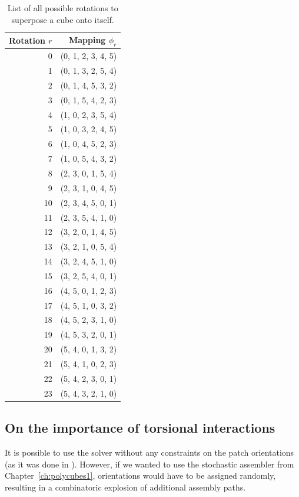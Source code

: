 \begin{table}[h]
    \centering
    \caption{List of all possible rotations to superpose a cube onto itself.}
    \begin{tabular}{|r|r|}
    \hline
    Rotation \(r\) & Mapping \(\phi_r\) \\
    \hline
    \hline
    0 & (0,  1,  2,  3,  4,  5) \\
    1 & (0,  1,  3,  2,  5,  4) \\
    2 & (0,  1,  4,  5,  3,  2) \\
    3 & (0,  1,  5,  4,  2,  3) \\
    4 & (1,  0,  2,  3,  5,  4) \\
    5 & (1,  0,  3,  2,  4,  5) \\
    6 & (1,  0,  4,  5,  2,  3) \\
    7 & (1,  0,  5,  4,  3,  2) \\
    8 & (2,  3,  0,  1,  5,  4) \\
    9 & (2,  3,  1,  0,  4,  5) \\
    10 & (2,  3,  4,  5,  0,  1) \\
    11 & (2,  3,  5,  4,  1,  0) \\
    12 & (3,  2,  0,  1,  4,  5) \\
    13 & (3,  2,  1,  0,  5,  4) \\
    14 & (3,  2,  4,  5,  1,  0) \\
    15 & (3,  2,  5,  4,  0,  1) \\
    16 & (4,  5,  0,  1,  2,  3) \\
    17 & (4,  5,  1,  0,  3,  2) \\
    18 & (4,  5,  2,  3,  1,  0) \\
    19 & (4,  5,  3,  2,  0,  1) \\
    20 & (5,  4,  0,  1,  3,  2) \\
    21 & (5,  4,  1,  0,  2,  3) \\
    22 & (5,  4,  2,  3,  0,  1) \\
    23 & (5,  4,  3,  2,  1,  0) \\
    \hline
    \end{tabular}
    \label{tab:cubeRotations}
\end{table}

\subsection{On the importance of torsional interactions}

It is possible to use the solver without any constraints on the patch orientations (as it was done in \cite{romano2020designing}). However, if we wanted to use the stochastic assembler from Chapter~\ref{ch:polycubes1}, orientations would have to be assigned randomly, resulting in a combinatoric explosion of additional assembly paths.

